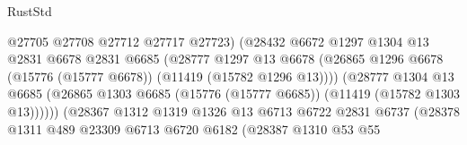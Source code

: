 \begin{lexlean}{RustStd}
\begin{coremodule}
                                          @27705
                                          @27708
                                          @27712
                                          @27717
                                          @27723)
                                        (@28432
                                          @6672
                                          @1297
                                          @1304
                                          @13
                                          @2831
                                          @6678
                                          @2831
                                          @6685
                                          (@28777
                                            @1297
                                            @13
                                            @6678
                                            (@26865
                                              @1296
                                              @6678
                                              (@15776 (@15777 @6678))
                                              (@11419 (@15782 @1296 @13))))
                                          (@28777
                                            @1304
                                            @13
                                            @6685
                                            (@26865
                                              @1303
                                              @6685
                                              (@15776 (@15777 @6685))
                                              (@11419 (@15782 @1303 @13))))))
                                      (@28367
                                        @1312
                                        @1319
                                        @1326
                                        @13
                                        @6713
                                        @6722
                                        @2831
                                        @6737
                                        (@28378
                                          @1311
                                          @489
                                          @23309
                                          @6713
                                          @6720
                                          @6182
                                          (@28387
                                            @1310
                                            @53
                                            @55

\end{coremodule}
\end{lexlean}
